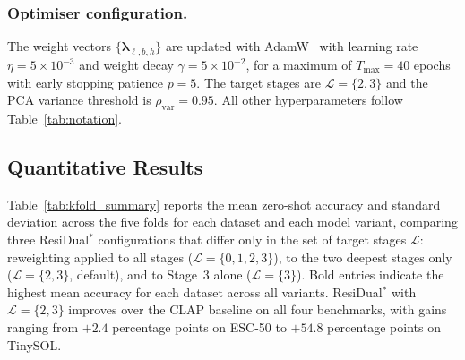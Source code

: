 \subsubsection{Optimiser configuration.}
The weight vectors $\{\boldsymbol{\lambda}_{\ell,b,h}\}$ 
are updated with AdamW~\cite{adamw} with 
learning rate $\eta = 5 \times 10^{-3}$ and weight decay 
$\gamma = 5 \times 10^{-2}$, for a maximum of $T_{\max} = 40$ 
epochs with early stopping patience $p = 5$. The target stages 
are $\mathcal{L} = \{2, 3\}$ and the PCA variance threshold is 
$\rho_{\mathrm{var}} = 0.95$. All other hyperparameters follow 
Table~\ref{tab:notation}.

\subsection{Quantitative Results}
\label{app:kfold_results}

Table~\ref{tab:kfold_summary} reports the mean zero-shot accuracy and 
standard deviation across the five folds for each dataset and each model 
variant, comparing three ResiDual$^*$\xspace configurations that differ only in 
the set of target stages $\mathcal{L}$: reweighting applied to all stages 
($\mathcal{L}=\{0,1,2,3\}$), to the two deepest stages only 
($\mathcal{L}=\{2,3\}$, default), and to Stage~3 alone 
($\mathcal{L}=\{3\}$). 
Bold entries indicate the highest mean accuracy for each dataset across 
all variants. 
ResiDual$^*$\xspace with $\mathcal{L}=\{2,3\}$ improves over the CLAP baseline 
on all four benchmarks, with gains ranging from $+2.4$ percentage points 
on ESC-50 to $+54.8$ percentage points on TinySOL.

